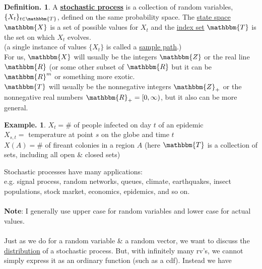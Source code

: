 \documentclass[12pt]{article}
\theoremstyle{definition}
\newtheorem{mydef}{Definition.}[section]
\newtheorem{myexp}{Example.}[section]
\theoremstyle{plain}
\begin{document}
\begin{mydef}
A \underline{\textbf{stochastic process}} is a collection of random variables, $\{X_t\}_{t \in \mathbbm{T}}$, defined on the same probability space. The \underline{state space} $\mathbbm{X}$ is a set of possible values for $X_t$ and the \underline{index set} $\mathbbm{T}$ is the set on which $X_t$ evolves.\\
(a single instance of values $\{X_t\}$ is called a \underline{sample path}.) \\
For us, $\mathbbm{X}$ will usually be the integers $\mathbbm{Z}$ or the real line $\mathbbm{R}$ (or some other subset of $\mathbbm{R}$ but it can be $\mathbbm{R}^m$ or something more exotic. \\
$\mathbbm{T}$ will usually be the nonnegative integers $\mathbbm{Z}_+$ or the nonnegative real numbers $\mathbbm{R}_+ = [0, \infty)$, but it also can be more general. 
\end{mydef}

\begin{myexp}
$X_t=\#$ of people infected on day $t$ of an epidemic \\
$X_{s,t}=$ temperature at point $s$ on the globe and time $t$ \\
$X(A)=\#$ of fireant colonies in a region $A$ (here $\mathbbm{T}$ is a collection of sets, including all open \& closed sets)
\end{myexp}
$\mbox{}$\\
Stochastic processes have many applications: \\
e.g. signal process, random networks, queues, climate, earthquakes, insect populations, stock market, economics, epidemics, and so on. \\ \\
\textbf{Note}: I generally use upper case for random variables and lower case for actual values.\\ \\
Just as we do for a random variable \& a  random vector, we want to discuss the \underline{distribution} of a stochastic process. But, with infinitely many rv's, we cannot simply express it as an ordinary function (such as a cdf). Instead we have 









\clearpage
\end{document}
